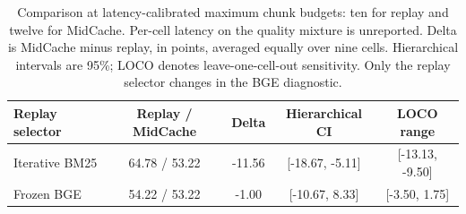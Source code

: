 \begin{table}[htbp]
\centering
\small
\setlength{\tabcolsep}{4pt}
\begin{tabular}{@{}lcccc@{}}
\toprule
Replay selector & Replay / MidCache & Delta & Hierarchical CI & LOCO range \\
\midrule
Iterative BM25 & 64.78 / 53.22 & -11.56 & [-18.67, -5.11] & [-13.13, -9.50] \\
Frozen BGE & 54.22 / 53.22 & -1.00 & [-10.67, 8.33] & [-3.50, 1.75] \\
\bottomrule
\end{tabular}
\caption{Comparison at latency-calibrated maximum chunk budgets: ten for replay and twelve for MidCache. Per-cell latency on the quality mixture is unreported. Delta is MidCache minus replay, in points, averaged equally over nine cells. Hierarchical intervals are 95\%; LOCO denotes leave-one-cell-out sensitivity. Only the replay selector changes in the BGE diagnostic.}
\label{tab:equal-latency}
\end{table}
